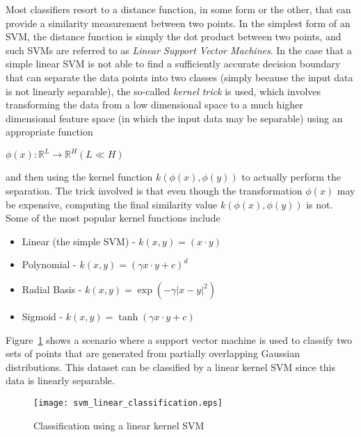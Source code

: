 Most classifiers resort to a distance function, in some form or the other, that can provide a similarity measurement between two points. In the simplest form of an SVM, the distance function is simply the dot product between two points, and such SVMs are referred to as \emph{Linear Support Vector Machines}. In the case that a simple linear SVM is not able to find a sufficiently accurate decision boundary that can separate the data points into two classes (simply because the input data is not linearly separable), the so-called \emph{kernel trick} is used, which involves transforming the data from a low dimensional space to a much higher dimensional feature space (in which the input data may be separable) using an appropriate function

\begin{center}
    $\phi(x): \mathbb{R}^{L} \rightarrow \mathbb{R}^H (L \ll H)$
\end{center}

and then using the kernel function $k(\phi(x), \phi(y))$ to actually perform the separation. The trick involved is that even though the transformation $\phi(x)$ may be expensive, computing the final similarity value $k(\phi(x), \phi(y))$ is not.\\

Some of the most popular kernel functions include
\begin{itemize}
    \item{Linear (the simple SVM) - $k(x, y) = (x \cdot y)$ }
    \item{Polynomial - $k(x, y) = (\gamma x \cdot y + c)^{d}$}
    \item{Radial Basis - $k(x, y) = \exp(-\gamma {| x - y |}^{2})$}
    \item{Sigmoid - $k(x, y) = \tanh(\gamma x \cdot y + c)$}
\end{itemize}

Figure~\ref{fig:svm_linear_classify} shows a scenario where a support vector machine is used to classify two sets of points that are generated from partially overlapping Gaussian distributions. This dataset can be classified by a linear kernel SVM since this data is linearly separable.\\

\begin{figure}[t!]
    \centering
    \texttt{[image: svm\_linear\_classification.eps]}
    \caption{Classification using a linear kernel SVM}
    \label{fig:svm_linear_classify}
\end{figure}

